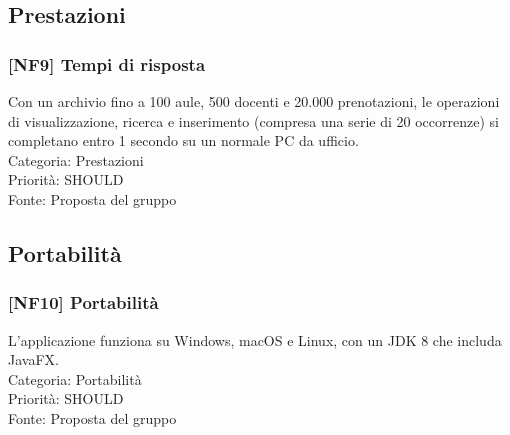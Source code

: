 \subsection{Prestazioni}
\subsubsection{[NF9] Tempi di risposta}
Con un archivio fino a 100 aule, 500 docenti e 20.000 prenotazioni, le operazioni di visualizzazione, ricerca e inserimento (compresa una serie di 20 occorrenze) si completano entro 1 secondo su un normale PC da ufficio.\\
Categoria: Prestazioni\\Priorità: SHOULD\\Fonte: Proposta del gruppo

\subsection{Portabilità}
\subsubsection{[NF10] Portabilità}
L'applicazione funziona su Windows, macOS e Linux, con un JDK 8 che includa JavaFX.\\
Categoria: Portabilità\\Priorità: SHOULD\\Fonte: Proposta del gruppo

